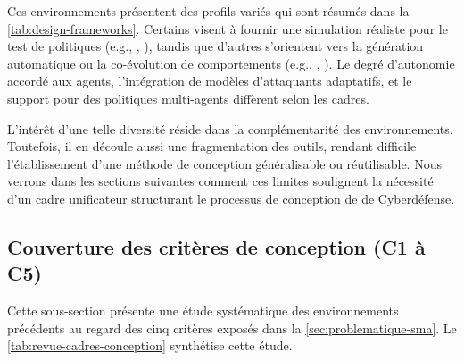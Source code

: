 \medskip

Ces environnements présentent des profils variés qui sont résumés dans la \autoref{tab:design-frameworks}. Certains visent à fournir une simulation réaliste pour le test de politiques (e.g., , ), tandis que d'autres s'orientent vers la génération automatique ou la co-évolution de comportements (e.g., , ). Le degré d'autonomie accordé aux agents, l'intégration de modèles d'attaquants adaptatifs, et le support pour des politiques multi-agents diffèrent selon les cadres.

L'intérêt d'une telle diversité réside dans la complémentarité des environnements. Toutefois, il en découle aussi une fragmentation des outils, rendant difficile l'établissement d'une méthode de conception généralisable ou réutilisable. Nous verrons dans les sections suivantes comment ces limites soulignent la nécessité d'un cadre unificateur structurant le processus de conception de  de Cyberdéfense.

\subsection{Couverture des critères de conception (C1 à C5)}

Cette sous-section présente une étude systématique des environnements précédents au regard des cinq critères exposés dans la \autoref{sec:problematique-sma}. Le \autoref{tab:revue-cadres-conception} synthétise cette étude.

